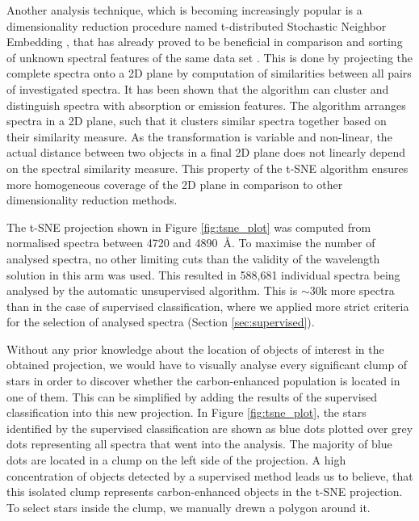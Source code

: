Another analysis technique, which is becoming increasingly popular is a dimensionality reduction procedure named t-distributed Stochastic Neighbor Embedding \citep[t-SNE,][]{van2008visualizing}, that has already proved to be beneficial in comparison and sorting of unknown spectral features of the same data set \citep{2017ApJS..228...24T}. This is done by projecting the complete spectra onto a 2D plane by computation of similarities between all pairs of investigated spectra. It has been shown that the algorithm can cluster and distinguish spectra with absorption or emission features. The algorithm arranges spectra in a 2D plane, such that it clusters similar spectra together based on their similarity measure. As the transformation is variable and non-linear, the actual distance between two objects in a final 2D plane does not linearly depend on the spectral similarity measure. This property of the t-SNE algorithm ensures more homogeneous coverage of the 2D plane in comparison to other dimensionality reduction methods.

The t-SNE projection shown in Figure \ref{fig:tsne_plot} was computed from normalised spectra between 4720 and 4890~\AA. To maximise the number of analysed spectra, no other limiting cuts than the validity of the wavelength solution \citep[bit 1 in \texttt{red\_flag} set to 0 by reduction pipeline, ][]{2017MNRAS.464.1259K} in this arm was used. This resulted in 588,681 individual spectra being analysed by the automatic unsupervised algorithm. This is $\sim30$k more spectra than in the case of supervised classification, where we applied more strict criteria for the selection of analysed spectra (Section \ref{sec:supervised}). 

Without any prior knowledge about the location of objects of interest in the obtained projection, we would have to visually analyse every significant clump of stars in order to discover whether the carbon-enhanced population is located in one of them. This can be simplified by adding the results of the supervised classification into this new projection. In Figure \ref{fig:tsne_plot}, the stars identified by the supervised classification are shown as blue dots plotted over grey dots representing all spectra that went into the analysis. The majority of blue dots are located in a clump on the left side of the projection. A high concentration of objects detected by a supervised method leads us to believe, that this isolated clump represents carbon-enhanced objects in the t-SNE projection. To select stars inside the clump, we manually drewn a polygon around it.

